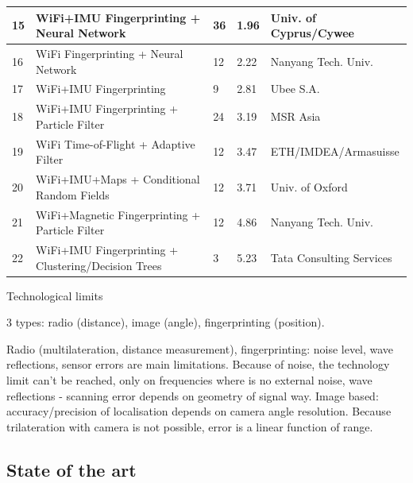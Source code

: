 \begin{table}[]
{\begin{tabular}{|l|l|l|l|l|}
15 & WiFi+IMU Fingerprinting + Neural Network & 36 & 1.96 & Univ. of Cyprus/Cywee \\ \hline
16 & WiFi Fingerprinting + Neural Network & 12 & 2.22 & Nanyang Tech. Univ. \\ \hline
17 & WiFi+IMU Fingerprinting & 9 & 2.81 & Ubee S.A. \\ \hline
18 & WiFi+IMU Fingerprinting + Particle Filter & 24 & 3.19 & MSR Asia \\ \hline
19 & WiFi Time-of-Flight + Adaptive Filter & 12 & 3.47 & ETH/IMDEA/Armasuisse \\ \hline
20 & WiFi+IMU+Maps + Conditional Random Fields & 12 & 3.71 & Univ. of Oxford \\ \hline
21 & WiFi+Magnetic Fingerprinting + Particle Filter & 12 & 4.86 & Nanyang Tech. Univ. \\ \hline
22 & WiFi+IMU Fingerprinting + Clustering/Decision Trees & 3 & 5.23 & Tata Consulting Services \\ \hline
\end{tabular}%
}
\end{table}

Technological limits

3 types: radio (distance), image (angle), fingerprinting (position).

Radio (multilateration, distance measurement), fingerprinting: noise level, wave reflections, sensor errors are main limitations.
Because of noise, the technology limit can’t be reached, only on frequencies where is no external noise, wave reflections - scanning error depends on geometry of signal way.
Image based: accuracy/precision of localisation depends on camera angle resolution. Because trilateration with camera is not possible, error is a linear function of range.



\subsection{State of the art}

